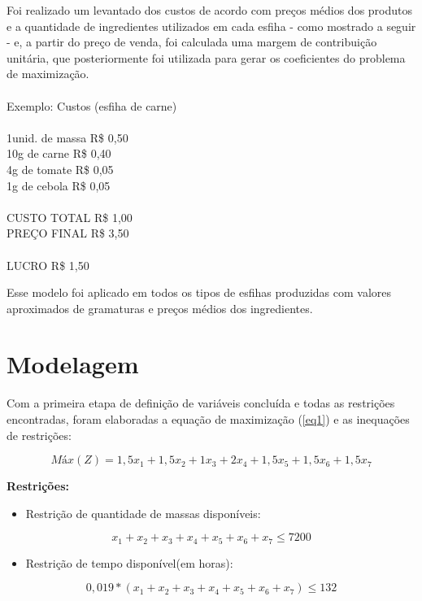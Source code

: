 \documentclass[
	12pt,				%
	openright,			%
	oneside,			%
	a4paper,			%
	english,			%
	french,				%
	spanish,			%
	brazil				%
	]{abntex2}
\begin{document}
	Foi realizado um levantado dos custos de acordo com preços médios dos produtos e a quantidade de ingredientes utilizados em cada esfiha - como mostrado a seguir - e, a partir do preço de venda, foi calculada uma margem de contribuição unitária, que posteriormente foi utilizada para gerar os coeficientes do problema de maximização.\\
\\
Exemplo: Custos (esfiha de carne)\\
\\
1unid. de massa \dotfill R\$ 0,50\\
10g de carne \dotfill R\$ 0,40\\
4g de tomate \dotfill R\$ 0,05\\
1g de cebola \dotfill R\$ 0,05\\
\\
CUSTO TOTAL \dotfill R\$ 1,00\\
PREÇO FINAL \dotfill R\$ 3,50\\
\\
LUCRO \dotfill R\$ 1,50

Esse modelo foi aplicado em todos os tipos de esfihas produzidas com valores aproximados de gramaturas e preços médios dos ingredientes.

\chapter{Modelagem}

	Com a primeira etapa de definição de variáveis concluída e todas as restrições encontradas, foram elaboradas a equação de maximização (\ref{eq1}) e as inequações de restrições:

\begin{equation} \label{eq1}
Máx (Z) = 1,5x_1 + 1,5x_2 + 1x_3 + 2x_4 + 1,5x_5 + 1,5x_6 + 1,5x_7
\end{equation}

\textbf{Restrições:}
	
\begin{itemize}
\item Restrição de quantidade de massas disponíveis:
\end{itemize}
\begin{equation}
x_1 + x_2 + x_3 + x_4 + x_5 + x_6 + x_7 \leq 7200
\end{equation}

\begin{itemize}
\item Restrição de tempo disponível(em horas):
\end{itemize}
\begin{equation}
0,019*(x_1 + x_2 + x_3 + x_4 + x_5 + x_6 + x_7) \leq 132
\end{equation}
\end{document}
